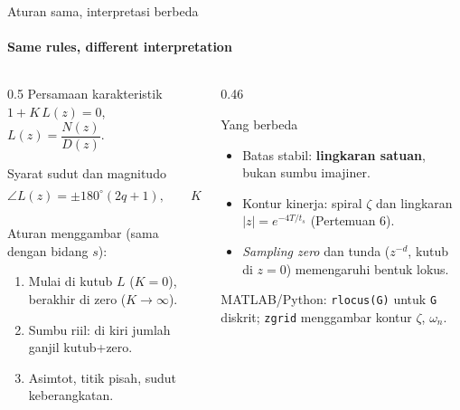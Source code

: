 \documentclass[aspectratio=169,10pt]{beamer}
\begin{document}
\begin{frame}{Aturan sama, interpretasi berbeda}
	\framesubtitle{Same rules, different interpretation}
	\begin{columns}[T]
		\begin{column}{0.5\textwidth}
			\small
			Persamaan karakteristik $1 + K\,L(z) = 0$, $L(z) = \dfrac{N(z)}{D(z)}$.
			\begin{block}{Syarat sudut dan magnitudo}
				\[
					\angle L(z) = \pm180^\circ(2q+1),\qquad K = \frac{1}{|L(z)|}
				\]
			\end{block}
			Aturan menggambar (sama dengan bidang $s$):
			\begin{enumerate}
				\item Mulai di kutub $L$ ($K=0$), berakhir di zero ($K\to\infty$).
				\item Sumbu riil: di kiri jumlah ganjil kutub+zero.
				\item Asimtot, titik pisah, sudut keberangkatan.
			\end{enumerate}
		\end{column}
		\begin{column}{0.46\textwidth}
			\begin{alertblock}{Yang berbeda}
				\small
				\begin{itemize}
					\item Batas stabil: \textbf{lingkaran satuan}, bukan sumbu imajiner.
					\item Kontur kinerja: spiral $\zeta$ dan lingkaran $|z| = e^{-4T/t_s}$ (Pertemuan 6).
					\item \textit{Sampling zero} dan tunda ($z^{-d}$, kutub di $z=0$) memengaruhi bentuk lokus.
				\end{itemize}
			\end{alertblock}
			{\scriptsize MATLAB/Python: \texttt{rlocus(G)} untuk \texttt{G} diskrit; \texttt{zgrid} menggambar kontur $\zeta$, $\omega_n$.}
		\end{column}
	\end{columns}
\end{frame}
\end{document}
